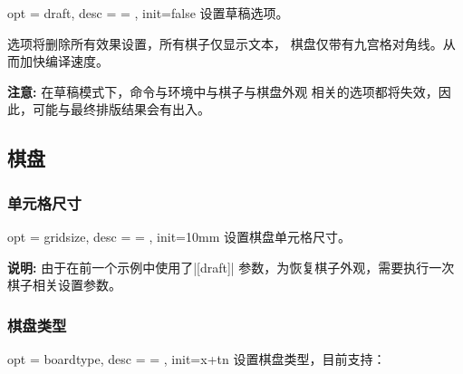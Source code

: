 \documentclass[full]{l3doc}
\begin{document}
\begin{documentation}
\begin{option}{ opt = draft, desc = {= }, init=false }
  设置草稿选项。
\end{option}

  选项将删除所有效果设置，所有棋子仅显示文本，
  棋盘仅带有九宫格对角线。从而加快编译速度。

  \textbf{\textsf{注意: }}在草稿模式下，命令与环境中与棋子与棋盘外观
  相关的选项都将失效，因此，可能与最终排版结果会有出入。

\begin{SideBySideExample}[frame=single,numbers=left,
                xrightmargin=.53\linewidth,gobble=2]
  \centering
  \cchessboard[draft]
\end{SideBySideExample}
\subsection{棋盘}

\subsubsection{单元格尺寸}

\begin{option}{ opt = gridsize, desc = {= }, init=10mm }
  设置棋盘单元格尺寸。
\end{option}

  \textbf{\textsf{说明: }}由于在前一个示例中使用了|[draft]|%
  参数，为恢复棋子外观，需要执行一次棋子相关设置参数。

\begin{SideBySideExample}[frame=single,numbers=left,
                xrightmargin=.60\linewidth,gobble=2]
  \centering
  \cchessboard[gridsize=15mm,
               piecetype=ooo]
\end{SideBySideExample}

\bigskip

\subsubsection{棋盘类型}

\begin{option}{ opt = boardtype, desc = {= }, init=x+tn }
  设置棋盘类型，目前支持：
\end{option}


\end{documentation}
\end{document}
